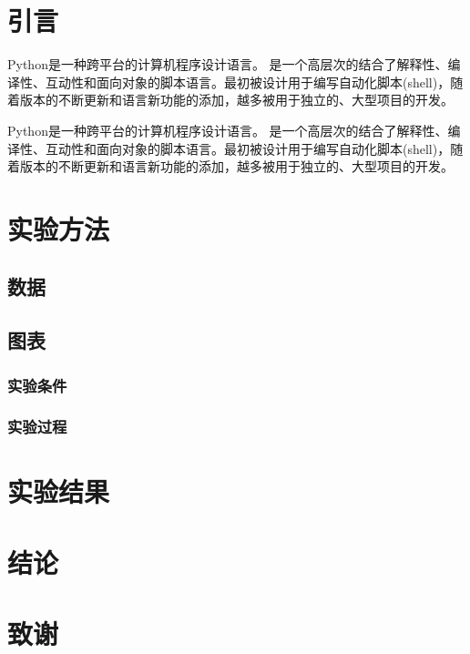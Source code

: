 \documentclass[]{ctexart}
\title{}
\author{}
\begin{document}
	\tableofcontents
	\newpage%
	\section{引言}
	Python是一种跨平台的计算机程序设计语言。 是一个高层次的结合了解释性、编译性、互动性和面向对象的脚本语言。最初被设计用于编写自动化脚本(shell)，随着版本的不断更新和语言新功能的添加，越多被用于独立的、大型项目的开发。
	
	Python是一种跨平台的计算机程序设计语言。 是一个高层次的结合了解释性、编译性、互动性和面向对象的脚本语言。最初被设计用于编写自动化脚本(shell)，随着版本的不断更新和语言新功能的添加，越多被用于独立的、大型项目的开发。
	\section{实验方法}
	\subsection{数据}
	\subsection{图表}
	\subsubsection{实验条件}
	\subsubsection{实验过程}
	\section{实验结果}
	\section{结论}
	\section{致谢}
\end{document}
